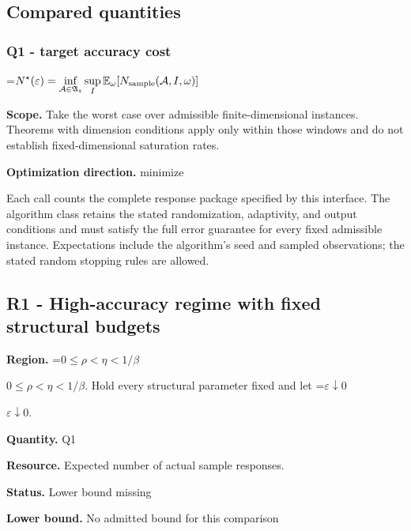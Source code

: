 \documentclass[10pt,a4paper]{article}
\newcommand{\AtlasMath}[1]{\par\begingroup\centering\setbox0=\hbox{$\displaystyle #1$}\ifdim\wd0>1.4\linewidth\typeout{ATLAS WIDE FORMULA: \the\wd0}\fi\ifdim\wd0>\linewidth\resizebox{\linewidth}{!}{\box0}\else\box0\fi\par\endgroup}
\newcommand{\AtlasInlineMath}[1]{\begingroup\setbox0=\hbox{$#1$}\ifdim\wd0>.4\linewidth\endgroup\AtlasMath{#1}\else\endgroup$#1$\fi}
\begin{document}
\subsection{Compared quantities}


\subsubsection{Q1 - target accuracy cost}


\AtlasMath{N^\star(\varepsilon)=\inf_{\mathcal A\in\mathfrak A_\varepsilon}\sup_I \mathbb E_\omega[N_{\rm sample}(\mathcal A,I,\omega)]}


\textbf{Scope.} Take the worst case over admissible finite-dimensional instances. Theorems with dimension conditions apply only within those windows and do not establish fixed-dimensional saturation rates.



\textbf{Optimization direction.} minimize



Each call counts the complete response package specified by this interface. The algorithm class retains the stated randomization, adaptivity, and output conditions and must satisfy the full error guarantee for every fixed admissible instance. Expectations include the algorithm's seed and sampled observations; the stated random stopping rules are allowed.



\subsection{R1 - High-accuracy regime with fixed structural budgets}


\textbf{Region.} \AtlasInlineMath{0\le\rho<\eta<1/\beta}. Hold every structural parameter fixed and let \AtlasInlineMath{\varepsilon\downarrow0}.



\textbf{Quantity.} Q1



\textbf{Resource.} Expected number of actual sample responses.



\textbf{Status.} Lower bound missing



\textbf{Lower bound.} No admitted bound for this comparison
\end{document}
